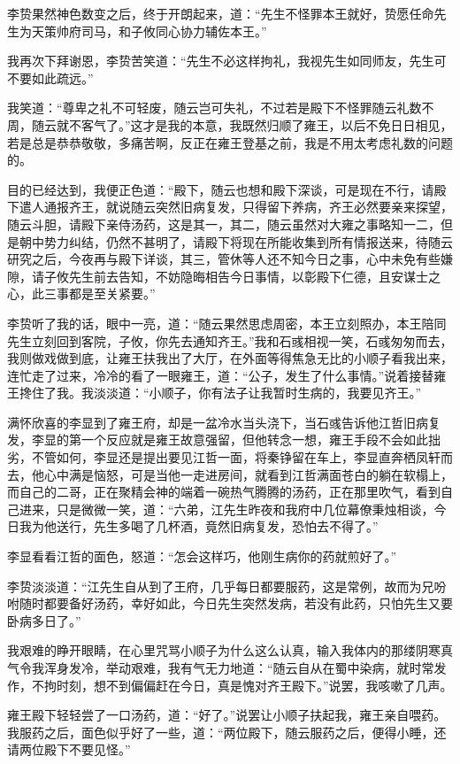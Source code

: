 李贽果然神色数变之后，终于开朗起来，道：“先生不怪罪本王就好，贽愿任命先生为天策帅府司马，和子攸同心协力辅佐本王。”

我再次下拜谢恩，李贽苦笑道：“先生不必这样拘礼，我视先生如同师友，先生可不要如此疏远。”

我笑道：“尊卑之礼不可轻废，随云岂可失礼，不过若是殿下不怪罪随云礼数不周，随云就不客气了。”这才是我的本意，我既然归顺了雍王，以后不免日日相见，若是总是恭恭敬敬，多痛苦啊，反正在雍王登基之前，我是不用太考虑礼数的问题的。

目的已经达到，我便正色道：“殿下，随云也想和殿下深谈，可是现在不行，请殿下遣人通报齐王，就说随云突然旧病复发，只得留下养病，齐王必然要亲来探望，随云斗胆，请殿下亲侍汤药，这是其一，其二，随云虽然对大雍之事略知一二，但是朝中势力纠结，仍然不甚明了，请殿下将现在所能收集到所有情报送来，待随云研究之后，今夜再与殿下详谈，其三，管休等人还不知今日之事，心中未免有些嫌隙，请子攸先生前去告知，不妨隐晦相告今日事情，以彰殿下仁德，且安谋士之心，此三事都是至关紧要。”

李贽听了我的话，眼中一亮，道：“随云果然思虑周密，本王立刻照办，本王陪同先生立刻回到客院，子攸，你先去通知齐王。”我和石彧相视一笑，石彧匆匆而去，我则做戏做到底，让雍王扶我出了大厅，在外面等得焦急无比的小顺子看我出来，连忙走了过来，冷冷的看了一眼雍王，道：“公子，发生了什么事情。”说着接替雍王搀住了我。我淡淡道：“小顺子，你有法子让我暂时生病的，我要见齐王。”

满怀欣喜的李显到了雍王府，却是一盆冷水当头浇下，当石彧告诉他江哲旧病复发，李显的第一个反应就是雍王故意强留，但他转念一想，雍王手段不会如此拙劣，不管如何，李显还是提出要见江哲一面，将秦铮留在车上，李显直奔栖凤轩而去，他心中满是恼怒，可是当他一走进房间，就看到江哲满面苍白的躺在软榻上，而自己的二哥，正在聚精会神的端着一碗热气腾腾的汤药，正在那里吹气，看到自己进来，只是微微一笑，道：“六弟，江先生昨夜和我府中几位幕僚秉烛相谈，今日我为他送行，先生多喝了几杯酒，竟然旧病复发，恐怕去不得了。”

李显看看江哲的面色，怒道：“怎会这样巧，他刚生病你的药就煎好了。”

李贽淡淡道：“江先生自从到了王府，几乎每日都要服药，这是常例，故而为兄吩咐随时都要备好汤药，幸好如此，今日先生突然发病，若没有此药，只怕先生又要卧病多日了。”

我艰难的睁开眼睛，在心里咒骂小顺子为什么这么认真，输入我体内的那缕阴寒真气令我浑身发冷，举动艰难，我有气无力地道：“随云自从在蜀中染病，就时常发作，不拘时刻，想不到偏偏赶在今日，真是愧对齐王殿下。”说罢，我咳嗽了几声。

雍王殿下轻轻尝了一口汤药，道：“好了。”说罢让小顺子扶起我，雍王亲自喂药。我服药之后，面色似乎好了一些，道：“两位殿下，随云服药之后，便得小睡，还请两位殿下不要见怪。”

